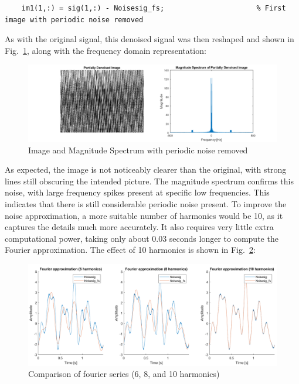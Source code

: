 \documentclass[12pt]{article}
\numberwithin{equation}{section}
\numberwithin{figure}{section}
\numberwithin{table}{section}
\begin{document}
\begin{verbatim}
    im1(1,:) = sig(1,:) - Noisesig_fs;                      % First image with periodic noise removed
\end{verbatim}

As with the original signal, this denoised signal was then reshaped and shown
in Fig.~\ref{fig:p2-im1}, along with the frequency domain representation:

\begin{figure}[ht]
    \centering
    \includegraphics{figures/p2-im1.png}
    \caption{Image and Magnitude Spectrum with periodic noise removed\label{fig:p2-im1}}
\end{figure}

As expected, the image is not noticeably clearer than the original, with strong
lines still obscuring the intended picture. The magnitude spectrum confirms
this noise, with large frequency spikes present at specific low frequencies.
This indicates that there is still considerable periodic noise present. To
improve the noise approximation, a more suitable number of harmonics would be
10, as it captures the details much more accurately. It also requires very
little extra computational power, taking only about 0.03 seconds longer to
compute the Fourier approximation. The effect of 10 harmonics is shown in
Fig.~\ref{fig:p2-compharms}:

\begin{figure}[ht]
    \centering
    \includegraphics{figures/p2-compharms.png}
    \caption{Comparison of fourier series (6, 8, and 10 harmonics)\label{fig:p2-compharms}}
\end{figure}
\end{document}
